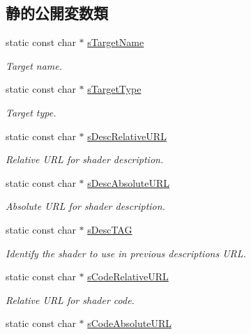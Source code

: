 \subsection*{静的公開変数類}
\begin{DoxyCompactItemize}
\item 
static const char $\ast$ \hyperlink{class_fbx_binding_table_aa49dfec94118aab9dafba3e1032cc8d5}{s\+Target\+Name}
\begin{DoxyCompactList}\small\item\em Target name. \end{DoxyCompactList}\item 
static const char $\ast$ \hyperlink{class_fbx_binding_table_ad9d25de472ef5c70e26293f768d1184f}{s\+Target\+Type}
\begin{DoxyCompactList}\small\item\em Target type. \end{DoxyCompactList}\item 
static const char $\ast$ \hyperlink{class_fbx_binding_table_abf0f711d3e53bfe5a28097f578a59e59}{s\+Desc\+Relative\+U\+RL}
\begin{DoxyCompactList}\small\item\em Relative U\+RL for shader description. \end{DoxyCompactList}\item 
static const char $\ast$ \hyperlink{class_fbx_binding_table_a61930494610fd12785f34b07bd7249af}{s\+Desc\+Absolute\+U\+RL}
\begin{DoxyCompactList}\small\item\em Absolute U\+RL for shader description. \end{DoxyCompactList}\item 
static const char $\ast$ \hyperlink{class_fbx_binding_table_a0536e5bee95808c32640c75fab26db61}{s\+Desc\+T\+AG}
\begin{DoxyCompactList}\small\item\em Identify the shader to use in previous description\textquotesingle{}s U\+RL. \end{DoxyCompactList}\item 
static const char $\ast$ \hyperlink{class_fbx_binding_table_adffd58c9c375cd433f083ef54ee33162}{s\+Code\+Relative\+U\+RL}
\begin{DoxyCompactList}\small\item\em Relative U\+RL for shader code. \end{DoxyCompactList}\item 
static const char $\ast$ \hyperlink{class_fbx_binding_table_aa325052377541732db179bf60c9c9d3d}{s\+Code\+Absolute\+U\+RL}

\end{DoxyCompactItemize}
